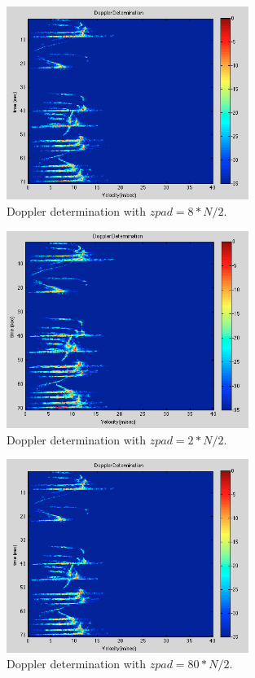 \documentclass{article}
\begin{document}
\begin{figure}[h!t]
\centering
\includegraphics[width=0.7\textwidth]{Figures/zpad_normal.png}
\caption{Doppler determination with $zpad = 8*N/2$.}
\label{fig:zpad_normal}
\end{figure}
\begin{figure}[h!t]
\centering
\includegraphics[width=0.7\textwidth]{Figures/zpad_reduced.png}
\caption{Doppler determination with $zpad = 2*N/2$.}
\label{fig:zpad_reduced}
\end{figure}
\begin{figure}[h!t]
\centering
\includegraphics[width=0.7\textwidth]{Figures/zpad_increased.png}
\caption{Doppler determination with $zpad = 80*N/2$.}
\label{fig:zpad_increased}
\end{figure}
\end{document}
